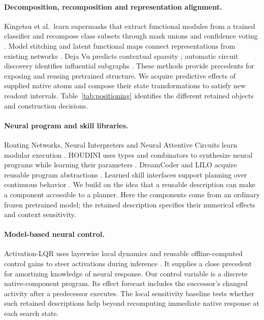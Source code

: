 \documentclass[11pt]{article}
\begin{document}
\paragraph{Decomposition, recomposition and representation alignment.}
Kingetsu et al.\ learn supermasks that extract functional modules from a
trained classifier and recompose class subsets through mask unions and
confidence voting \citep{recomposition}. Model stitching and latent functional
maps connect representations from existing networks \citep{stitching,lfm}.
Deja Vu predicts contextual sparsity \citep{dejavu}; automatic circuit discovery
identifies influential subgraphs \citep{acdc}. These methods provide precedents
for exposing and reusing pretrained structure. We acquire predictive effects
of supplied native atoms and compose their state transformations to satisfy
new readout intervals. Table~\ref{tab:positioning} identifies the different
retained objects and construction decisions.

\paragraph{Neural program and skill libraries.}
Routing Networks, Neural Interpreters and Neural Attentive Circuits learn
modular execution \citep{routing,interpreters,nac}. HOUDINI uses types and
combinators to synthesize neural programs while learning their parameters
\citep{houdini}. DreamCoder and LILO acquire reusable program abstractions
\citep{dreamcoder,lilo}. Learned skill interfaces support planning over
continuous behavior \citep{skills,neuroskills}. We build on the idea that a
reusable description can make a component accessible to a planner. Here the
components come from an ordinary frozen pretrained model; the retained
description specifies their numerical effects and context sensitivity.

\paragraph{Model-based neural control.}
Activation-LQR uses layerwise local dynamics and reusable offline-computed
control gains to steer activations during inference \citep{alqr}. It supplies
a close precedent for amortizing knowledge of neural response. Our control
variable is a discrete native-component program. Its effect forecast includes
the successor's changed activity after a predecessor executes. The local
sensitivity baseline tests whether such retained descriptions help beyond
recomputing immediate native response at each search state.
\end{document}
